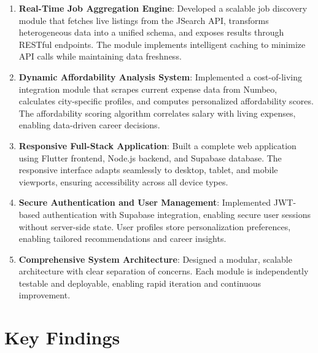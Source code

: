 \begin{enumerate}
    \item \textbf{Real-Time Job Aggregation Engine}: Developed a scalable job discovery module that fetches live listings from the JSearch API, transforms heterogeneous data into a unified schema, and exposes results through RESTful endpoints. The module implements intelligent caching to minimize API calls while maintaining data freshness.
    
    \item \textbf{Dynamic Affordability Analysis System}: Implemented a cost-of-living integration module that scrapes current expense data from Numbeo, calculates city-specific profiles, and computes personalized affordability scores. The affordability scoring algorithm correlates salary with living expenses, enabling data-driven career decisions.
    
    \item \textbf{Responsive Full-Stack Application}: Built a complete web application using Flutter frontend, Node.js backend, and Supabase database. The responsive interface adapts seamlessly to desktop, tablet, and mobile viewports, ensuring accessibility across all device types.
    
    \item \textbf{Secure Authentication and User Management}: Implemented JWT-based authentication with Supabase integration, enabling secure user sessions without server-side state. User profiles store personalization preferences, enabling tailored recommendations and career insights.
    
    \item \textbf{Comprehensive System Architecture}: Designed a modular, scalable architecture with clear separation of concerns. Each module is independently testable and deployable, enabling rapid iteration and continuous improvement.
\end{enumerate}

\section{Key Findings}

